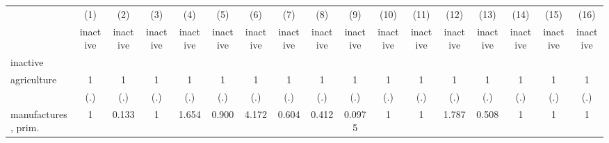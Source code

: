 {
\def\sym#1{\ifmmode^{#1}\else\(^{#1}\)\fi}
\begin{tabular}{l*{16}{c}}
\hline\hline
                    &\multicolumn{1}{c}{(1)}&\multicolumn{1}{c}{(2)}&\multicolumn{1}{c}{(3)}&\multicolumn{1}{c}{(4)}&\multicolumn{1}{c}{(5)}&\multicolumn{1}{c}{(6)}&\multicolumn{1}{c}{(7)}&\multicolumn{1}{c}{(8)}&\multicolumn{1}{c}{(9)}&\multicolumn{1}{c}{(10)}&\multicolumn{1}{c}{(11)}&\multicolumn{1}{c}{(12)}&\multicolumn{1}{c}{(13)}&\multicolumn{1}{c}{(14)}&\multicolumn{1}{c}{(15)}&\multicolumn{1}{c}{(16)}\\
                    &\multicolumn{1}{c}{inactive}&\multicolumn{1}{c}{inactive}&\multicolumn{1}{c}{inactive}&\multicolumn{1}{c}{inactive}&\multicolumn{1}{c}{inactive}&\multicolumn{1}{c}{inactive}&\multicolumn{1}{c}{inactive}&\multicolumn{1}{c}{inactive}&\multicolumn{1}{c}{inactive}&\multicolumn{1}{c}{inactive}&\multicolumn{1}{c}{inactive}&\multicolumn{1}{c}{inactive}&\multicolumn{1}{c}{inactive}&\multicolumn{1}{c}{inactive}&\multicolumn{1}{c}{inactive}&\multicolumn{1}{c}{inactive}\\
\hline
inactive            &                     &                     &                     &                     &                     &                     &                     &                     &                     &                     &                     &                     &                     &                     &                     &                     \\
agriculture         &           1         &           1         &           1         &           1         &           1         &           1         &           1         &           1         &           1         &           1         &           1         &           1         &           1         &           1         &           1         &           1         \\
                    &         (.)         &         (.)         &         (.)         &         (.)         &         (.)         &         (.)         &         (.)         &         (.)         &         (.)         &         (.)         &         (.)         &         (.)         &         (.)         &         (.)         &         (.)         &         (.)         \\
[1em]
manufactures, prim. &           1         &       0.133         &           1         &       1.654         &       0.900         &       4.172         &       0.604         &       0.412         &      0.0975         &           1         &           1         &       1.787         &       0.508         &           1         &           1         &           1         \\

\end{tabular}}
